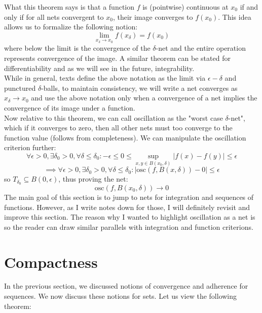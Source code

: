 \documentclass[10pt,letterpaper]{article} %
\begin{document}
What this theorem says is that a function $f$ is (pointwise) continuous at $x_0$ if and only if for all nets convergent to $x_0$, their image converges to $f(x_0)$. This idea allows us to formalize the following notion:
\begin{equation*}
\lim_{x_\delta \xrightarrow{} x_0} f(x_\delta) = f(x_0)
\end{equation*}
where below the limit is the convergence of the $\delta$-net and the entire operation represents convergence of the image. A similar theorem can be stated for differentiability and as we will see in the future, integrability.\\

While in general, texts define the above notation as the limit via $\epsilon-\delta$ and punctured $\delta$-balls, to maintain consistency, we will write a net converges as $x_\delta \xrightarrow{} x_0$ and use the above notation only when a convergence of a net implies the convergence of its image under a function.\\

Now relative to this theorem, we can call oscillation as the "worst case $\delta$-net", which if it converges to zero, then all other nets must too converge to the function value (follows from completeness). We can manipulate the oscillation criterion further:
\begin{equation*}
\forall \epsilon > 0, \exists \delta_0 > 0, \forall \delta \leqslant \delta_0: - \epsilon \leqslant 0 \leqslant \sup_{x, y \in B(x_0, \delta)}|f(x) - f(y)| \leqslant \epsilon  
\end{equation*}
\begin{equation*}
\implies \forall \epsilon > 0, \exists \delta_0 > 0, \forall \delta \leqslant \delta_0: \left|\text{osc}(f, B(x, \delta))-0\right| \leqslant \epsilon
\end{equation*}
so $T_{\delta_0} \subseteq B(0, \epsilon)$, thus proving the net:
\begin{equation*}
\text{osc}(f, B(x_0, \delta)) \xrightarrow{} 0
\end{equation*}
The main goal of this section is to jump to nets for integration and sequences of functions. However, as I write notes down for those, I will definitely revisit and improve this section. The reason why I wanted to highlight oscillation as a net is so the reader can draw similar parallels with integration and function criterions.
\pagebreak

\section{Compactness}
In the previous section, we discussed notions of convergence and adherence for sequences. We now discuss these notions for sets. Let us view the following theorem:
\end{document}
